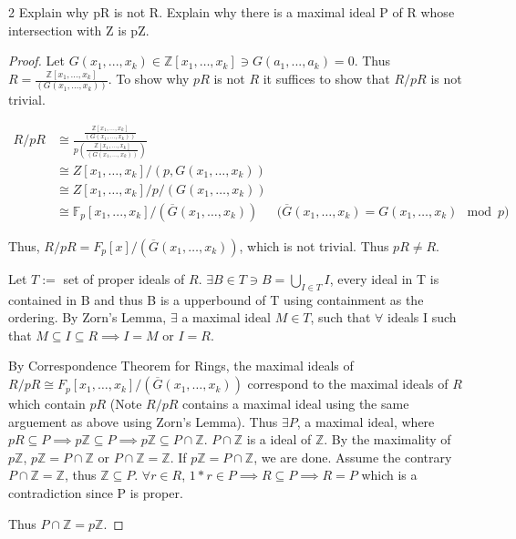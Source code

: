 \documentclass{article}
\newcommand{\Z}{\mathbb{Z}}
\newcommand{\F}{\mathbb{F}}
\begin{document}
\begin{PROB}{2}\label{Problem 2.}
    Explain why pR is not R. Explain why there is a maximal ideal P of R whose intersection with Z is pZ. 
\end{PROB}
\begin{proof}
    Let $G(x_1, ..., x_k) \in \Z[x_1, \dots, x_k] \ni G(a_1, ..., a_k) = 0$. Thus $R = \frac{\Z[x_1, \dots, x_k]}{(G(x_1, \dots, x_k))}$. To show why $pR$ is not $R$ it suffices to show that $R / pR$ is not trivial. 
    
    \begin{align*}
        R / pR &\cong \frac{\frac{\Z[x_1, \dots, x_k]}{(G(x_1, \dots, x_k))}} {p(\frac{\Z[x_1, \dots, x_k]}{(G(x_1, \dots, x_k))})} \\
        &\cong Z[x_1, \dots, x_k] / (p, G(x_1, \dots, x_k)) \\
        &\cong Z[x_1, \dots, x_k] / p / (G(x_1, \dots, x_k)) \\
        &\cong \F_p[x_1, ..., x_k] / (\overline{G}(x_1, \dots, x_k)) & \text{($\overline{G}(x_1, \dots, x_k) = G(x_1, \dots, x_k) \mod p$)}
    \end{align*} 
    
    Thus, $R / pR = F_p[x] / (\overline{G}(x_1, \dots, x_k))$, which is not trivial. Thus $pR \neq R$. 

    Let $T := $ set of proper ideals of $R$. $\exists B \in T \ni B = \bigcup_{I \in T}I$, every ideal in T is contained in B and thus B is a upperbound of T using containment as the ordering. By Zorn's Lemma, $\exists$ a maximal ideal $M \in T$, such that $\forall$ ideals I such that $M \subseteq I \subseteq R \implies I = M$ or $I = R$.
    
    By Correspondence Theorem for Rings, the maximal ideals of $R / pR \cong F_p[x_1, \dots, x_k] /(\overline{G}(x_1, \dots, x_k))$ correspond to the maximal ideals of $R$ which contain $pR$ (Note $R / pR$ contains a maximal ideal using the same arguement as above using Zorn's Lemma). Thus $\exists P$, a maximal ideal, where $pR \subseteq P \implies p\Z \subseteq P \implies  p\Z \subseteq P \cap \Z$. $P \cap \Z$ is a ideal of $\Z$. By the maximality of $p\Z$, $p\Z = P \cap \Z$ or $P \cap \Z = \Z$. If $p\Z = P \cap \Z$, we are done. Assume the contrary $P \cap \Z = \Z$, thus $\Z \subseteq P$. $\forall r \in R$, $1*r  \in P \implies R \subseteq P \implies R = P$ which is a contradiction since P is proper. 
    
    Thus $P \cap \Z = p\Z$.  
\end{proof}
\end{document}
